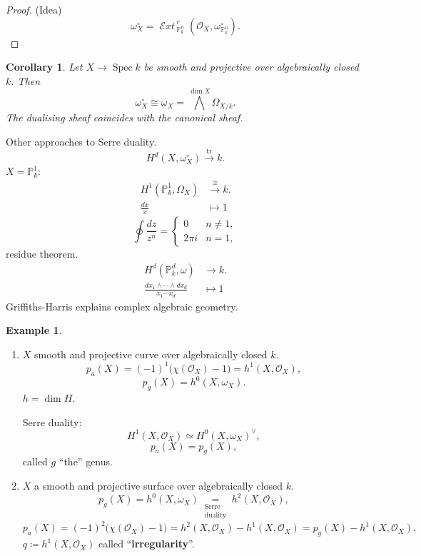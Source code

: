 \documentclass[12pt]{article}
\DeclareMathOperator{\Spec}{Spec}
\DeclareMathOperator{\shExt}{\mathcal{E}\textit{xt}\,}
\DeclareMathOperator{\tr}{tr}
\newtheorem*{corollary}{Corollary}
\theoremstyle{definition}
\newtheorem*{example}{Example}
\theoremstyle{remark}
\newtheorem*{comment}{Comment}
\begin{document}
\begin{proof}
(Idea)
\[\omega_X^{\circ}=\shExt_{\mathbb{P}_k^n}^r(\mathcal{O}_X,\omega_{\mathbb{P}_k^n}^{\circ}).\]
\end{proof}

\begin{corollary}
Let $X\rightarrow\Spec k$ be smooth and projective over algebraically closed $k$. Then
\[\omega_X^{\circ}\cong\omega_X={\bigwedge}^{\dim X}\Omega_{X/k}.\]
The dualising sheaf coincides with the canonical sheaf.
\end{corollary}

Other approaches to Serre duality.
\[H^d(X,\omega_X^{\circ})\overset{\tr}{\longrightarrow}k.\]
$X=\mathbb{P}_k^1$:
\begin{align*}
H^1(\mathbb{P}_k^1,\Omega_X)&\overset{\cong}{\longrightarrow}k.\\
\frac{dx}{x}&\longmapsto1
\end{align*}
\[\oint\frac{dz}{z^n}=\left\{\begin{array}{ll}0&n\neq1,\\2\pi i&n=1,\end{array}\right.\]
residue theorem.
\begin{align*}
H^d(\mathbb{P}_k^d,\omega)&\longrightarrow k.\\
\frac{dx_1\wedge\cdots\wedge dx_d}{x_1\cdots x_d}&\longmapsto1
\end{align*}
Griffiths-Harris \cite{griffiths2014principles} explains complex algebraic geometry.

\begin{example}
\begin{enumerate}[label=\arabic*)]
\item $X$ smooth and projective curve over algebraically closed $k$.
\[p_a(X)=(-1)^1\big(\chi(\mathcal{O}_X)-1\big)=h^1(X,\mathcal{O}_X),\]
\[p_g(X)=h^0(X,\omega_X).\]
$h=\dim H$.

Serre duality:
\[H^1(X,\mathcal{O}_X)\simeq H^0(X,\omega_X)^{\vee},\]
\[p_a(X)=p_g(X),\]
called $g$ ``the'' genus.

\item $X$ a smooth and projective surface over algebraically closed $k$.
\[p_g(X)=h^0(X,\omega_X)\underset{\substack{\text{Serre}\\\text{duality}}}{=}h^2(X,\mathcal{O}_X),\]
\[p_a(X)=(-1)^2\big(\chi(\mathcal{O}_X)-1\big)=h^2(X,\mathcal{O}_X)-h^1(X,\mathcal{O}_X)=p_g(X)-h^1(X,\mathcal{O}_X),\]
$q\coloneqq h^1(X,\mathcal{O}_X)$ called ``\textbf{irregularity}''.

\begin{comment}
Some time ago it was called ``irregularity'', because it was thought that it should be $0$, but recently it was discovered that the cases where it is $0$ are actually very few, so now it is known that this value does not need to be $0$. However, it keeps being called ``irregularity''.
\end{comment}
\end{enumerate}
\end{example}
\end{document}

